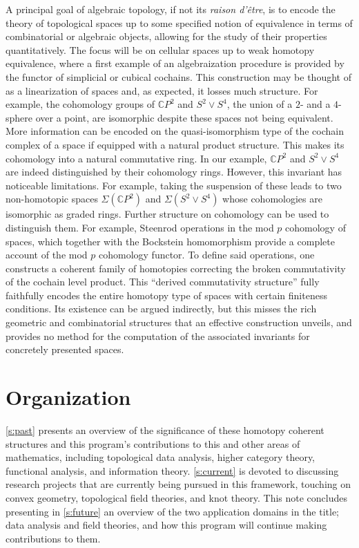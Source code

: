 A principal goal of algebraic topology, if not its \emph{raison d'\^{e}tre}, is to encode the theory of topological spaces up to some specified notion of equivalence in terms of combinatorial or algebraic objects, allowing for the study of their properties quantitatively.
The focus will be on cellular spaces up to weak homotopy equivalence, where a first example of an algebraization procedure is provided by the functor of simplicial or cubical cochains.
This construction may be thought of as a linearization of spaces and, as expected, it losses much structure.
For example, the cohomology groups of $\mathbb{C} P^2$ and $S^2 \vee S^4$, the union of a $2$- and a $4$-sphere over a point, are isomorphic despite these spaces not being equivalent.
More information can be encoded on the quasi-isomorphism type of the cochain complex of a space if equipped with a natural product structure.
This makes its cohomology into a natural commutative ring.
In our example, $\mathbb{C} P^2$ and $S^2 \vee S^4$ are indeed distinguished by their cohomology rings.
However, this invariant has noticeable limitations.
For example, taking the suspension of these leads to two non-homotopic spaces $\Sigma(\mathbb{C} P^2)$ and $\Sigma(S^2 \vee S^4)$ whose cohomologies are isomorphic as graded rings.
Further structure on cohomology can be used to distinguish them.
For example, Steenrod operations in the mod $p$ cohomology of spaces, which together with the Bockstein homomorphism provide a complete account of the mod $p$ cohomology functor.
To define said operations, one constructs a coherent family of homotopies correcting the broken commutativity of the cochain level product.
This ``derived commutativity structure'' fully faithfully encodes the entire homotopy type of spaces with certain finiteness conditions.
Its existence can be argued indirectly, but this misses the rich geometric and combinatorial structures that an effective construction unveils, and provides no method for the computation of the associated invariants for concretely presented spaces.

\section*{Organization}

\cref{s:past} presents an overview of the significance of these homotopy coherent structures and this program's contributions to this and other areas of mathematics, including topological data analysis, higher category theory, functional analysis, and information theory.
\cref{s:current} is devoted to discussing research projects that are currently being pursued in this framework, touching on convex geometry, topological field theories, and knot theory.
This note concludes presenting in \cref{s:future} an overview of the two application domains in the title; data analysis and field theories, and how this program will continue making contributions to them.
